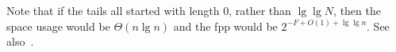 \documentclass[letterpaper,twocolumn,10pt]{article}
\newcommand{\ints}{\mathbb{Z}}
\newcommand{\TCF}{SCF}
\newcommand{\TCF}{TCF}
\begin{document}
Note that if the tails all started with length 0, rather than $\lg \lg N$, then the space usage would be $\Theta(n \lg n)$ and the fpp would be $2^{-F+O(1) + \lg \lg n}$.
See also~\cite{psw}.






\end{document}
